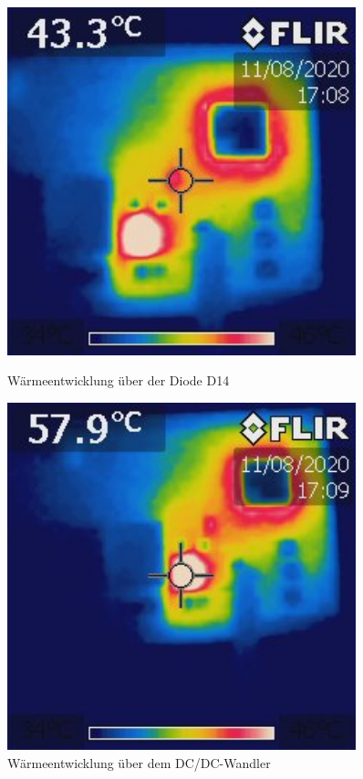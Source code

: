 \begin{figure}[htb]
	\centering
	\begin{minipage}[t]{0.45\linewidth}
		\centering
		\includegraphics[width=0.9\textwidth]{graphics/IR_Diode.jpg}
		\caption{Wärmeentwicklung über der Diode D14}
		\label{pic: IR_Diode}
	\end{minipage}%
	\hfill
	\begin{minipage}[t]{0.45\linewidth}
		\centering
		\includegraphics[width=0.9\textwidth]{graphics/IR_Wandler.jpg}
		\caption{Wärmeentwicklung über dem DC/DC-Wandler}
		\label{pic: IR_Wandler}
	\end{minipage}
\end{figure}

